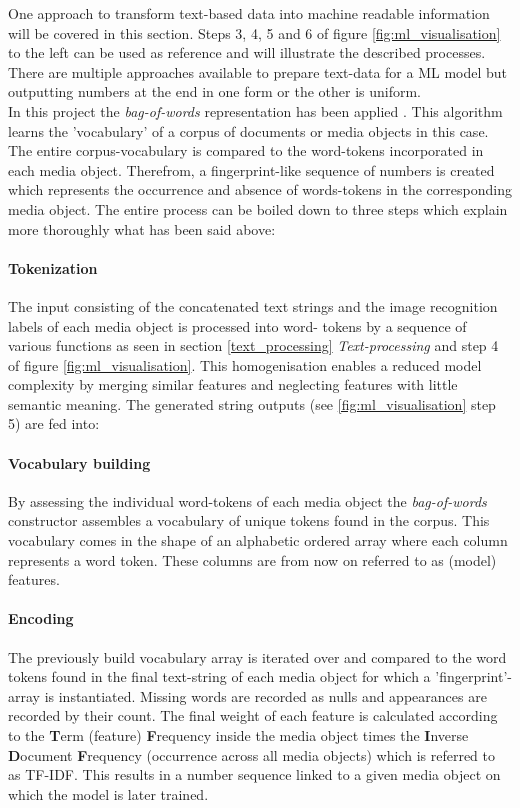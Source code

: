 One approach to transform text-based data into machine readable information will be covered in this section. Steps 3, 4, 5 and 6 of figure \ref{fig:ml_visualisation} to the left can be used as reference and will illustrate the described processes.\\
There are multiple approaches available to prepare text-data for a ML model but outputting numbers at the end in one form or the other is uniform.\\
In this project the \textit{bag-of-words} representation has been applied \parencite{Joulin2016}. This algorithm learns the 'vocabulary' of a corpus of documents or media objects in this case. The entire corpus-vocabulary is compared to the word-tokens incorporated in each media object. Therefrom, a fingerprint-like sequence of numbers is created which represents the occurrence and absence of words-tokens in the corresponding media object. The entire process can be boiled down to three steps which explain more thoroughly what has been said above:

\paragraph*{Tokenization} The input consisting of the concatenated text strings and the image recognition labels of each media object is processed into word- tokens by a sequence of various functions as seen in section \ref{text_processing} \textit{Text-processing} and step 4 of figure \ref{fig:ml_visualisation}. This homogenisation enables a reduced model complexity by merging similar features and neglecting features with little semantic meaning. The generated string outputs (see \ref{fig:ml_visualisation} step 5) are fed into:

\paragraph*{Vocabulary building} By assessing the individual word-tokens of each media object the \textit{bag-of-words} constructor assembles a vocabulary of unique tokens found in the corpus. This vocabulary comes in the shape of an alphabetic ordered array where each column represents a word token. These columns are from now on referred to as (model) features.

\paragraph*{Encoding} The previously build vocabulary array is iterated over and compared to the word tokens found in the final text-string of each media object for which a 'fingerprint'-array is instantiated. Missing words are recorded as nulls and appearances are recorded by their count. The final weight of each feature is calculated according to the \textbf{T}erm (feature) \textbf{F}requency inside the media object times the \textbf{I}nverse  \textbf{D}ocument  \textbf{F}requency (occurrence across all media objects) which is referred to as TF-IDF. This results in a number sequence linked to a given media object on which the model is later trained.

